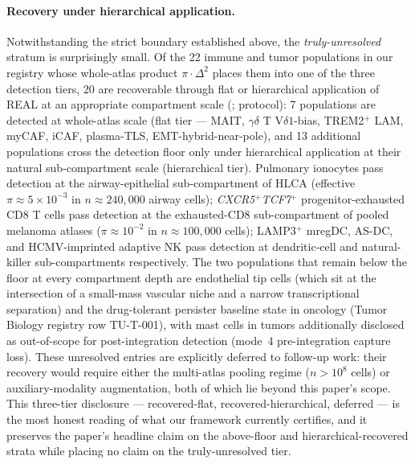 %
%

\paragraph*{Recovery under hierarchical application.}
Notwithstanding the strict boundary established above, the \emph{truly-unresolved} stratum is surprisingly small. Of the 22 immune and tumor populations in our registry whose whole-atlas product $\pi \cdot \Delta^{2}$ places them into one of the three detection tiers, 20 are recoverable through flat or hierarchical application of \textsc{REAL} at an appropriate compartment scale (;  protocol): 7 populations are detected at whole-atlas scale (flat tier --- MAIT, $\gamma\delta$ T V$\delta1$-bias, TREM2$^{+}$ LAM, myCAF, iCAF, plasma-TLS, EMT-hybrid-near-pole), and 13 additional populations cross the detection floor only under hierarchical application at their natural sub-compartment scale (hierarchical tier). Pulmonary ionocytes pass detection at the airway-epithelial sub-compartment of HLCA (effective $\pi \approx 5 \times 10^{-3}$ in $n \approx 240{,}000$ airway cells); \textit{CXCR5}$^{+}$\textit{TCF7}$^{+}$ progenitor-exhausted CD8 T cells pass detection at the exhausted-CD8 sub-compartment of pooled melanoma atlases ($\pi \approx 10^{-2}$ in $n \approx 100{,}000$ cells); LAMP3$^{+}$ mregDC, AS-DC, and HCMV-imprinted adaptive NK pass detection at dendritic-cell and natural-killer sub-compartments respectively. The two populations that remain below the floor at every compartment depth are endothelial tip cells (which sit at the intersection of a small-mass vascular niche and a narrow transcriptional separation) and the drug-tolerant persister baseline state in oncology (Tumor Biology registry row TU-T-001), with mast cells in tumors additionally disclosed as out-of-scope for post-integration detection (mode~4 pre-integration capture loss). These unresolved entries are explicitly deferred to follow-up work: their recovery would require either the multi-atlas pooling regime ($n > 10^{8}$ cells) or auxiliary-modality augmentation, both of which lie beyond this paper's scope. This three-tier disclosure --- recovered-flat, recovered-hierarchical, deferred --- is the most honest reading of what our framework currently certifies, and it preserves the paper's headline claim on the above-floor and hierarchical-recovered strata while placing no claim on the truly-unresolved tier.

